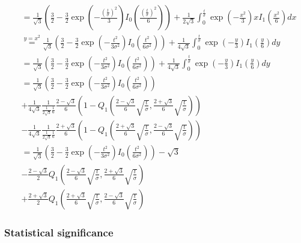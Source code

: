 \documentclass[a4paper,12pt]{article}
\theoremstyle{plain}
\theoremstyle{definition}
\theoremstyle{remark}
\begin{document}
\begin{align*}
	&= \frac{1}{\sqrt{3}} \left( \frac{3}{2} - \frac{3}{2} \exp \left( - \frac{\left( \frac{t}{\sigma} \right)^2}{3} \right) I_0 \left( \frac{\left( \frac{t}{\sigma} \right)^2}{6} \right) \right) + \frac{1}{2 \sqrt{3}} \int_0^\frac{t}{\sigma} \exp \left( - \frac{x^2}{3} \right) x I_1 \left( \frac{x^2}{6} \right) dx \\
	&\overset{y = x^2}{=} \frac{1}{\sqrt{3}} \left( \frac{3}{2} - \frac{3}{2} \exp \left( - \frac{t^2}{3 \sigma^2} \right) I_0 \left( \frac{t^2}{6 \sigma^2} \right) \right) + \frac{1}{4 \sqrt{3}} \int_0^\frac{t}{\sigma} \exp \left( - \frac{y}{3} \right) I_1 \left( \frac{y}{6} \right) dy \\
	&= \frac{1}{\sqrt{3}} \left( \frac{3}{2} - \frac{3}{2} \exp \left( - \frac{t^2}{3 \sigma^2} \right) I_0 \left( \frac{t^2}{6 \sigma^2} \right) \right) + \frac{1}{4 \sqrt{3}} \int_0^\frac{t}{\sigma} \exp \left( - \frac{y}{3} \right) I_1 \left( \frac{y}{6} \right) dy \\
	&= \frac{1}{\sqrt{3}} \left( \frac{3}{2} - \frac{3}{2} \exp \left( - \frac{t^2}{3 \sigma^2} \right) I_0 \left( \frac{t^2}{6 \sigma^2} \right) \right) \\
	&+ \frac{1}{4 \sqrt{3}} \frac{1}{\frac{1}{2 \sqrt{3}} \frac{1}{6}} \frac{2 - \sqrt{3}}{6} \left( 1 - Q_1 \left( \frac{2 - \sqrt{3}}{6} \sqrt{\frac{t}{\sigma}}, \frac{2 + \sqrt{3}}{6} \sqrt{\frac{t}{\sigma}} \right) \right) \\
	&- \frac{1}{4 \sqrt{3}} \frac{1}{\frac{1}{2 \sqrt{3}} \frac{1}{6}} \frac{2 + \sqrt{3}}{6} \left( 1 - Q_1 \left( \frac{2 + \sqrt{3}}{6} \sqrt{\frac{t}{\sigma}}, \frac{2 - \sqrt{3}}{6} \sqrt{\frac{t}{\sigma}} \right) \right) \\
	&= \frac{1}{\sqrt{3}} \left( \frac{3}{2} - \frac{3}{2} \exp \left( - \frac{t^2}{3 \sigma^2} \right) I_0 \left( \frac{t^2}{6 \sigma^2} \right) \right) - \sqrt{3} \\
	&- \frac{2 - \sqrt{3}}{2} Q_1 \left( \frac{2 - \sqrt{3}}{6} \sqrt{\frac{t}{\sigma}}, \frac{2 + \sqrt{3}}{6} \sqrt{\frac{t}{\sigma}} \right) \\
	&+ \frac{2 + \sqrt{3}}{2} Q_1 \left( \frac{2 + \sqrt{3}}{6} \sqrt{\frac{t}{\sigma}}, \frac{2 - \sqrt{3}}{6} \sqrt{\frac{t}{\sigma}} \right)
\end{align*}

\newpage

\subsubsection{Statistical significance}
\end{document}

